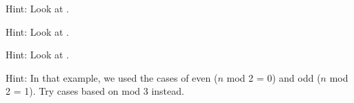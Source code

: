 \subsubsection*{ \answers}
\begin{apart}
    \item Hint: Look at .
    \item Hint: Look at .
    \item Hint: Look at .
    \item Hint: In that example, we used the cases of even ($n$ mod 2 = 0) and odd ($n$ mod 2 = 1).  Try cases based on mod 3 instead.
\end{apart}




